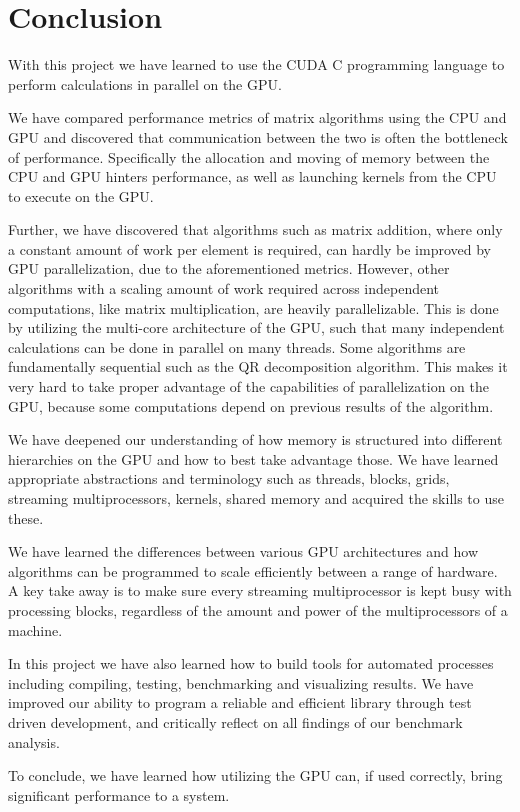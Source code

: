 \section{Conclusion}


With this project we have learned to use the CUDA C programming language to perform calculations in parallel on the GPU. 

We have compared performance metrics of matrix algorithms using the CPU and GPU and discovered that communication between the two is often the bottleneck of performance. Specifically the allocation and moving of memory between the CPU and GPU hinters performance, as well as launching kernels from the CPU to execute on the GPU. 

Further, we have discovered that algorithms such as matrix addition, where only a constant amount of work per element is required, can hardly be improved by GPU parallelization, due to the aforementioned metrics. However, other algorithms with a scaling amount of work required across independent computations, like matrix multiplication, are heavily parallelizable. This is done by utilizing the multi-core architecture of the GPU, such that many independent calculations can be done in parallel on many threads. Some algorithms are fundamentally sequential such as the QR decomposition algorithm. This makes it very hard to take proper advantage of the capabilities of parallelization on the GPU, because some computations depend on previous results of the algorithm. 

We have deepened our understanding of how memory is structured into different hierarchies on the GPU and how to best take advantage those. We have learned appropriate abstractions and terminology such as threads, blocks, grids, streaming multiprocessors, kernels, shared memory and acquired the skills to use these.

We have learned the differences between various GPU architectures and how algorithms can be programmed to scale efficiently between a range of hardware. A key take away is to make sure every streaming multiprocessor is kept busy with processing blocks, regardless of the amount and power of the multiprocessors of a machine.

In this project we have also learned how to build tools for automated processes including compiling, testing, benchmarking and visualizing results. We have improved our ability to program a reliable and efficient library through test driven development, and critically reflect on all findings of our benchmark analysis.

To conclude, we have learned how utilizing the GPU can, if used correctly, bring significant performance to a system. 